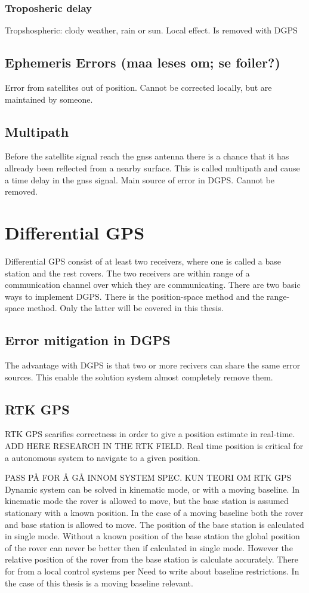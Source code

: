 \subsubsection{Troposheric delay}


Tropshospheric: clody weather, rain or sun. Local effect. Is removed with DGPS
\subsection{Ephemeris Errors (maa leses om; se foiler?)}
Error from satellites out of position. Cannot be corrected locally, but are maintained by someone.
\subsection{Multipath}
Before the satellite signal reach the gnss antenna there is a chance that it has allready been reflected from a nearby surface. This is called multipath and cause a time delay in the gnss signal. 
Main source of error in DGPS. Cannot be removed.
\section{Differential GPS}
Differential GPS consist of at least two receivers, where one is called a base station and the rest rovers. The two receivers are within range of a communication channel over which they are communicating. There are two basic ways to implement DGPS. There is the position-space method and the range-space method. Only the latter will be covered in this thesis.
\subsection{Error mitigation in DGPS}
The advantage with DGPS is that two or more recivers can share the same error sources. This enable the solution system almost completely remove them.



\subsection{RTK GPS}
RTK GPS scarifies correctness in order to give a position estimate in real-time. ADD HERE RESEARCH IN THE RTK FIELD. Real time position is critical for a autonomous system to navigate to a given position. 


PASS PÅ FOR Å GÅ INNOM SYSTEM SPEC. KUN TEORI OM RTK GPS
Dynamic system can be solved in kinematic mode, or with a moving baseline. In kinematic mode the rover is allowed to move, but the base station is assumed stationary with a known position. In the case of a moving baseline both the rover and base station is allowed to move. The position of the base station is calculated in single mode. Without a known position of the base station the global position of the rover can never be better then if calculated in single mode. However the relative position of the rover from the base station is calculate accurately. There for from a local control systems per
Need to write about baseline restrictions. In the case of this thesis is a moving baseline relevant.

